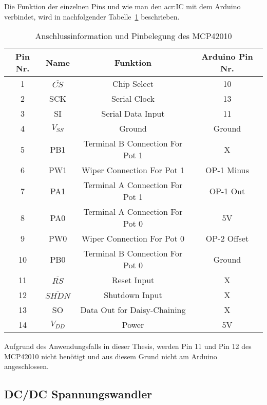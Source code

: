 Die Funktion der einzelnen Pins und wie man den \gls{acr:IC} mit dem Arduino verbindet, wird in nachfolgender Tabelle~\ref{tab:pinmcp} beschrieben. 
\begin{table}[htb]
	\begin{center}
		\begin{tabular}[H]{cccc}	
			\toprule
			\textbf{Pin Nr.} & \textbf{Name}  &\textbf{Funktion} & \textbf{Arduino Pin Nr.} \\
			\midrule
			1 & $\overline{CS}$ & Chip Select &  10 \\
			2 & SCK & Serial Clock &  13 \\
			3 & SI & Serial Data Input&  11 \\
			4 & $V_{SS}$ & Ground &  Ground \\
			5 & PB1 & Terminal B Connection For Pot 1 & X \\
			6 & PW1 & Wiper Connection For Pot 1 &  OP-1 Minus \\
			7 & PA1& Terminal A Connection For Pot 1 &  OP-1 Out  \\
			8 & PA0& Terminal A Connection For Pot 0 &  5V \\
			9 & PW0& Wiper Connection For Pot 0 & OP-2 Offset \\
			10 & PB0 & Terminal B Connection For Pot 0 &  Ground \\
			11 & $\overline{RS}$ & Reset Input & X  \\
			12 & $\overline{SHDN}$ & Shutdown Input &X\\
			13 & SO & Data Out for Daisy-Chaining & X \\
			14 & $V_{DD}$ & Power & 5V \\
			\bottomrule
		\end{tabular}
		\caption{Anschlussinformation und Pinbelegung des MCP42010}
		\label{tab:pinmcp}
	\end{center}
\end{table}
Aufgrund des Anwendungsfalls in dieser Thesis, werden Pin 11 und Pin 12 des MCP42010 nicht benötigt und aus diesem Grund nicht am Arduino angeschlossen. 

\subsection{DC/DC Spannungswandler}
\label{subsec:Unterabschnitt12}

